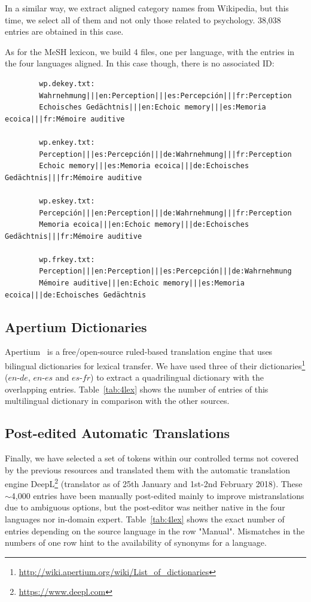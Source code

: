 \documentclass[a4paper,11pt]{article}
\begin{document}
	\bigskip
	In a similar way, we extract aligned category names from Wikipedia, but this time, we select all of them and not only those related to psychology. 38,038 entries are obtained in this case.
	
	As for the MeSH lexicon, we build 4 files, one per language, with the entries in the four languages aligned. In this case though, there is no associated ID:
	
	{\small 
		\begin{verbatim}
		wp.dekey.txt:
		Wahrnehmung|||en:Perception|||es:Percepción|||fr:Perception
		Echoisches Gedächtnis|||en:Echoic memory|||es:Memoria ecoica|||fr:Mémoire auditive
		
		wp.enkey.txt:
		Perception|||es:Percepción|||de:Wahrnehmung|||fr:Perception
		Echoic memory|||es:Memoria ecoica|||de:Echoisches Gedächtnis|||fr:Mémoire auditive
		
		wp.eskey.txt:
		Percepción|||en:Perception|||de:Wahrnehmung|||fr:Perception
		Memoria ecoica|||en:Echoic memory|||de:Echoisches Gedächtnis|||fr:Mémoire auditive
		
		wp.frkey.txt:
		Perception|||en:Perception|||es:Percepción|||de:Wahrnehmung
		Mémoire auditive|||en:Echoic memory|||es:Memoria ecoica|||de:Echoisches Gedächtnis
		\end{verbatim}
	}
	
	
	\subsection{Apertium Dictionaries}
	\label{ss:apertium}
	
	Apertium~\cite{forcadaEtal:2011} is a free/open-source ruled-based translation engine that uses bilingual dictionaries for lexical transfer. We have used three of their dictionaries\footnote{\url{http://wiki.apertium.org/wiki/List_of_dictionaries}} ($en$-$de$, $en$-$es$ and $es$-$fr$) to extract a quadrilingual dictionary with the overlapping entries. Table~\ref{tab:4lex} shows the number of entries of this multilingual dictionary in comparison with the other sources.
	
	\subsection{Post-edited Automatic Translations}
	\label{ss:manual}
	
	Finally, we have selected a set of tokens within our controlled terms not covered by the previous resources and translated them with the automatic translation engine DeepL\footnote{\url{https://www.deepl.com}}  (translator as of 25th January and 1st-2nd February 2018). These $\sim$4,000 entries have been manually post-edited  mainly to improve mistranslations due to ambiguous options, but the post-editor was neither native in the four languages nor in-domain expert. Table~\ref{tab:4lex} shows the exact number of entries depending on the source language in the row "Manual". Mismatches in the numbers of one row hint to the availability of synonyms for a language.
	
\end{document}
